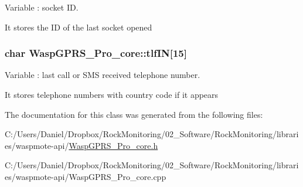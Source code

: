 Variable \+: socket ID. 

It stores the ID of the last socket opened 
\subsubsection[{\texorpdfstring{tlf\+IN}{tlfIN}}]{\setlength{\rightskip}{0pt plus 5cm}char Wasp\+G\+P\+R\+S\+\_\+\+Pro\+\_\+core\+::tlf\+IN\mbox{[}15\mbox{]}}\hypertarget{class_wasp_g_p_r_s___pro__core_a5c7dbd0508b7369149ff29723a56a925}{}\label{class_wasp_g_p_r_s___pro__core_a5c7dbd0508b7369149ff29723a56a925}


Variable \+: last call or S\+MS received telephone number. 

It stores telephone numbers with country code if it appears 

The documentation for this class was generated from the following files\+:\begin{DoxyCompactItemize}
\item 
C\+:/\+Users/\+Daniel/\+Dropbox/\+Rock\+Monitoring/02\+\_\+\+Software/\+Rock\+Monitoring/libraries/waspmote-\/api/\hyperlink{_wasp_g_p_r_s___pro__core_8h}{Wasp\+G\+P\+R\+S\+\_\+\+Pro\+\_\+core.\+h}\item 
C\+:/\+Users/\+Daniel/\+Dropbox/\+Rock\+Monitoring/02\+\_\+\+Software/\+Rock\+Monitoring/libraries/waspmote-\/api/Wasp\+G\+P\+R\+S\+\_\+\+Pro\+\_\+core.\+cpp\end{DoxyCompactItemize}
